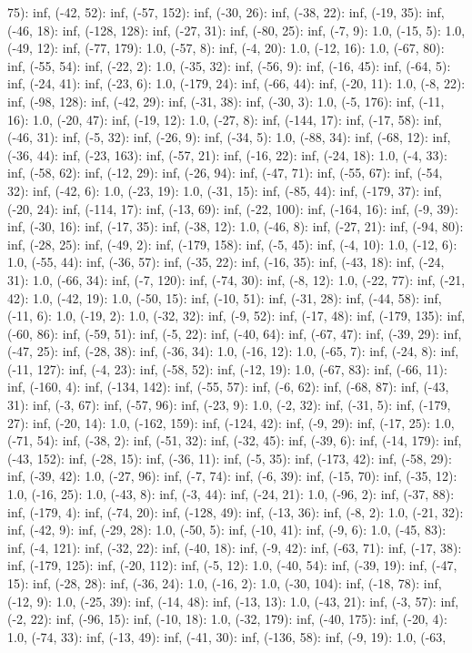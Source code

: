 \documentclass[parskip=half]{scrartcl}
\begin{document}
75): inf, (-42, 52): inf, (-57, 152): inf, (-30, 26): inf, (-38, 22): inf, (-19, 35): inf, (-46, 18): inf, (-128, 128): inf, (-27, 31): inf, (-80, 25): inf, (-7, 9): 1.0, (-15, 5): 1.0, (-49, 12): inf, (-77, 179): 1.0, (-57, 8): inf, (-4, 20): 1.0, (-12, 16): 1.0, (-67, 80): inf, (-55, 54): inf, (-22, 2): 1.0, (-35, 32): inf, (-56, 9): inf, (-16, 45): inf, (-64, 5): inf, (-24, 41): inf, (-23, 6): 1.0, (-179, 24): inf, (-66, 44): inf, (-20, 11): 1.0, (-8, 22): inf, (-98, 128): inf, (-42, 29): inf, (-31, 38): inf, (-30, 3): 1.0, (-5, 176): inf, (-11, 16): 1.0, (-20, 47): inf, (-19, 12): 1.0, (-27, 8): inf, (-144, 17): inf, (-17, 58): inf, (-46, 31): inf, (-5, 32): inf, (-26, 9): inf, (-34, 5): 1.0, (-88, 34): inf, (-68, 12): inf, (-36, 44): inf, (-23, 163): inf, (-57, 21): inf, (-16, 22): inf, (-24, 18): 1.0, (-4, 33): inf, (-58, 62): inf, (-12, 29): inf, (-26, 94): inf, (-47, 71): inf, (-55, 67): inf, (-54, 32): inf, (-42, 6): 1.0, (-23, 19): 1.0, (-31, 15): inf, (-85, 44): inf, (-179, 37): inf, (-20, 24): inf, (-114, 17): inf, (-13, 69): inf, (-22, 100): inf, (-164, 16): inf, (-9, 39): inf, (-30, 16): inf, (-17, 35): inf, (-38, 12): 1.0, (-46, 8): inf, (-27, 21): inf, (-94, 80): inf, (-28, 25): inf, (-49, 2): inf, (-179, 158): inf, (-5, 45): inf, (-4, 10): 1.0, (-12, 6): 1.0, (-55, 44): inf, (-36, 57): inf, (-35, 22): inf, (-16, 35): inf, (-43, 18): inf, (-24, 31): 1.0, (-66, 34): inf, (-7, 120): inf, (-74, 30): inf, (-8, 12): 1.0, (-22, 77): inf, (-21, 42): 1.0, (-42, 19): 1.0, (-50, 15): inf, (-10, 51): inf, (-31, 28): inf, (-44, 58): inf, (-11, 6): 1.0, (-19, 2): 1.0, (-32, 32): inf, (-9, 52): inf, (-17, 48): inf, (-179, 135): inf, (-60, 86): inf, (-59, 51): inf, (-5, 22): inf, (-40, 64): inf, (-67, 47): inf, (-39, 29): inf, (-47, 25): inf, (-28, 38): inf, (-36, 34): 1.0, (-16, 12): 1.0, (-65, 7): inf, (-24, 8): inf, (-11, 127): inf, (-4, 23): inf, (-58, 52): inf, (-12, 19): 1.0, (-67, 83): inf, (-66, 11): inf, (-160, 4): inf, (-134, 142): inf, (-55, 57): inf, (-6, 62): inf, (-68, 87): inf, (-43, 31): inf, (-3, 67): inf, (-57, 96): inf, (-23, 9): 1.0, (-2, 32): inf, (-31, 5): inf, (-179, 27): inf, (-20, 14): 1.0, (-162, 159): inf, (-124, 42): inf, (-9, 29): inf, (-17, 25): 1.0, (-71, 54): inf, (-38, 2): inf, (-51, 32): inf, (-32, 45): inf, (-39, 6): inf, (-14, 179): inf, (-43, 152): inf, (-28, 15): inf, (-36, 11): inf, (-5, 35): inf, (-173, 42): inf, (-58, 29): inf, (-39, 42): 1.0, (-27, 96): inf, (-7, 74): inf, (-6, 39): inf, (-15, 70): inf, (-35, 12): 1.0, (-16, 25): 1.0, (-43, 8): inf, (-3, 44): inf, (-24, 21): 1.0, (-96, 2): inf, (-37, 88): inf, (-179, 4): inf, (-74, 20): inf, (-128, 49): inf, (-13, 36): inf, (-8, 2): 1.0, (-21, 32): inf, (-42, 9): inf, (-29, 28): 1.0, (-50, 5): inf, (-10, 41): inf, (-9, 6): 1.0, (-45, 83): inf, (-4, 121): inf, (-32, 22): inf, (-40, 18): inf, (-9, 42): inf, (-63, 71): inf, (-17, 38): inf, (-179, 125): inf, (-20, 112): inf, (-5, 12): 1.0, (-40, 54): inf, (-39, 19): inf, (-47, 15): inf, (-28, 28): inf, (-36, 24): 1.0, (-16, 2): 1.0, (-30, 104): inf, (-18, 78): inf, (-12, 9): 1.0, (-25, 39): inf, (-14, 48): inf, (-13, 13): 1.0, (-43, 21): inf, (-3, 57): inf, (-2, 22): inf, (-96, 15): inf, (-10, 18): 1.0, (-32, 179): inf, (-40, 175): inf, (-20, 4): 1.0, (-74, 33): inf, (-13, 49): inf, (-41, 30): inf, (-136, 58): inf, (-9, 19): 1.0, (-63, 
\end{document}
